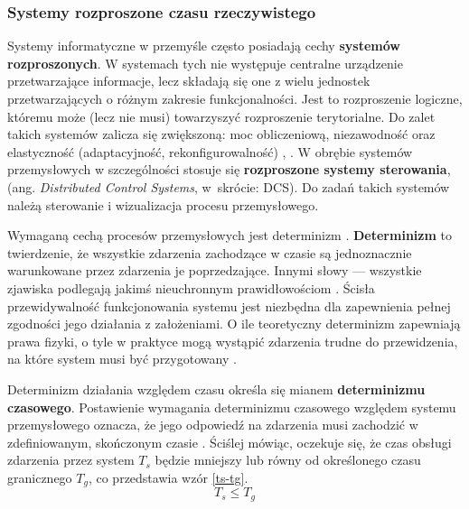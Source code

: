 \documentclass[a4paper, 12pt, twoside]{article}
\begin{document}
\subsubsection{Systemy rozproszone czasu rzeczywistego}

Systemy informatyczne w przemyśle często posiadają cechy \textbf{systemów rozproszonych}.
W systemach tych nie występuje centralne urządzenie
przetwarzające informacje, lecz składają się one z wielu jednostek
przetwarzających o różnym zakresie funkcjonalności. Jest to rozproszenie logiczne,
któremu może (lecz nie musi) towarzyszyć rozproszenie terytorialne. Do zalet
takich systemów zalicza się zwiększoną: moc obliczeniową, niezawodność oraz 
elastyczność (adaptacyjność, rekonfigurowalność)
\cite{isp},
\cite{isp-analiza-przepływu-informacji}. W obrębie systemów przemysłowych
w szczególności stosuje się \textbf{rozproszone systemy sterowania}, 
(ang. \emph{Distributed Control Systems}, w~skrócie: DCS). Do zadań takich systemów
należą sterowanie i wizualizacja procesu przemysłowego. 

Wymaganą cechą procesów przemysłowych jest determinizm \cite{isp}. \textbf{Determinizm}
to twierdzenie, że wszystkie zdarzenia zachodzące w czasie są jednoznacznie
warunkowane przez zdarzenia je poprzedzające. Innymi słowy --- wszystkie zjawiska
podlegają jakimś nieuchronnym prawidłowościom \cite{determinizm}. Ścisła przewidywalność
funkcjonowania systemu jest niezbędna dla zapewnienia pełnej zgodności 
jego działania z założeniami. O ile teoretyczny determinizm zapewniają prawa fizyki,
o tyle w praktyce mogą wystąpić zdarzenia trudne do przewidzenia, na które
system musi być przygotowany \cite{isp}.

Determinizm działania względem czasu określa się mianem \textbf{determinizmu czasowego}.
Postawienie wymagania determinizmu czasowego względem systemu przemysłowego oznacza,
że jego odpowiedź na zdarzenia musi zachodzić w zdefiniowanym, skończonym czasie
\cite{isp}.
Ściślej mówiąc, oczekuje się, że czas obsługi zdarzenia przez system $T_s$ będzie
mniejszy lub równy od określonego czasu granicznego $T_g$, co przedstawia 
wzór \ref{ts-tg}.
\begin{equation}
    T_s \leq T_g\label{ts-tg}
\end{equation}
\end{document}
